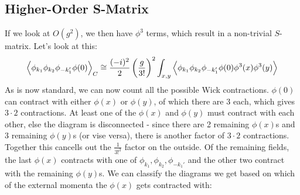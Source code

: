 \subsection{Higher-Order S-Matrix}

If we look at $O(g^2)$, we then have $\phi^3$ terms, which result in a non-trivial $S$-matrix. Let's look at this:
\begin{equation}
    \left< \phi_{k_1}\phi_{k_2}\phi_{-k_1'}\phi(0) \right>_C \cong \frac{(-i)^2}{2}\left(\frac{g}{3!}\right)^2\int_{x, y}\left< \phi_{k_1}\phi_{k_2}\phi_{-k_1'}\phi(0)\phi^3(x)\phi^3(y) \right>
\end{equation}
As is now standard, we can now count all the possible Wick contractions. $\phi(0)$ can contract with either $\phi(x)$ or $\phi(y)$, of which there are 3 each, which gives $3 \cdot 2$ contractions. At least one of the $\phi(x)$ and $\phi(y)$ must contract with each other, else the diagram is disconnected - since there are 2 remaining $\phi(x)$s and 3 remaining $\phi(y)$s (or vise versa), there is another factor of $3 \cdot 2$ contractions. Together this cancells out the $\frac{1}{3!^2}$ factor on the outside. Of the remaining fields, the last $\phi(x)$ contracts with one of $\phi_{k_1}, \phi_{k_2}, \phi_{-k_1'}$ and the other two contract with the remaining $\phi(y)$s. We can classify the diagrams we get based on which of the external momenta the $\phi(x)$ gets contracted with:


